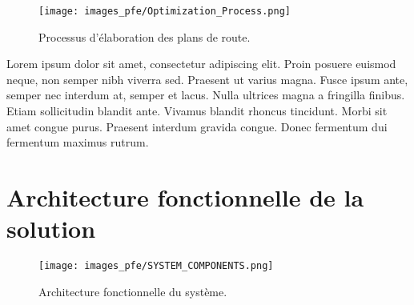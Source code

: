 \medskip

\begin{figure}[hbt!]
  \centering
  \texttt{[image: images\_pfe/Optimization\_Process.png]}
  \caption{Processus d'élaboration des plans de route.}
  \label{fig:optimisation-process}
\end{figure}
\FloatBarrier

Lorem ipsum dolor sit amet, consectetur adipiscing elit. Proin posuere euismod neque, non semper nibh viverra sed. Praesent ut varius magna. Fusce ipsum ante, semper nec interdum at, semper et lacus. Nulla ultrices magna a fringilla finibus. Etiam sollicitudin blandit ante. Vivamus blandit rhoncus tincidunt. Morbi sit amet congue purus. Praesent interdum gravida congue. Donec fermentum dui fermentum maximus rutrum.

\section{Architecture fonctionnelle de la solution}

\begin{figure}[hbt!]
  \centering
  \texttt{[image: images\_pfe/SYSTEM\_COMPONENTS.png]}
  \caption{Architecture fonctionnelle du système.}
  \label{fig:functional-architecture}
\end{figure}
\FloatBarrier

